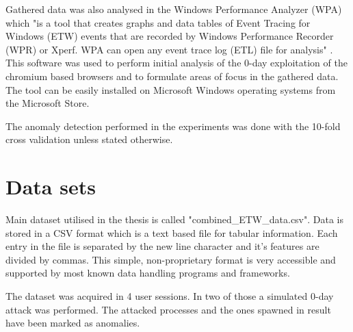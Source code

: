 \documentclass[a4paper,twoside,12pt]{book}
\begin{document}
Gathered data was also analysed in the Windows Performance Analyzer (WPA) which "is a tool that 
creates graphs and data tables of Event Tracing for Windows (ETW) events that are recorded 
by Windows Performance Recorder (WPR) or Xperf. WPA can open any event trace log (ETL) file 
for analysis" \cite{bib:wpa}. This software was used to perform initial analysis of the 0-day 
exploitation of the chromium based browsers and to formulate areas of focus in the gathered data. 
The tool can be easily installed on Microsoft Windows operating systems from the Microsoft Store.

The anomaly detection performed in the experiments was done with the 10-fold cross validation 
unless stated otherwise.

\section{Data sets}

Main dataset utilised in the thesis is called "combined\_ETW\_data.csv".
Data is stored in a CSV format which is a text based file for tabular information.  
Each entry in the file is separated by the new line character and it's features are divided 
by commas. This simple, non-proprietary format is very accessible and supported by most 
known data handling programs and frameworks. 

The dataset was acquired in 4 user sessions. In two of those a simulated 0-day attack was 
performed. The attacked processes and the ones spawned in result have been marked as anomalies. 
\end{document}
